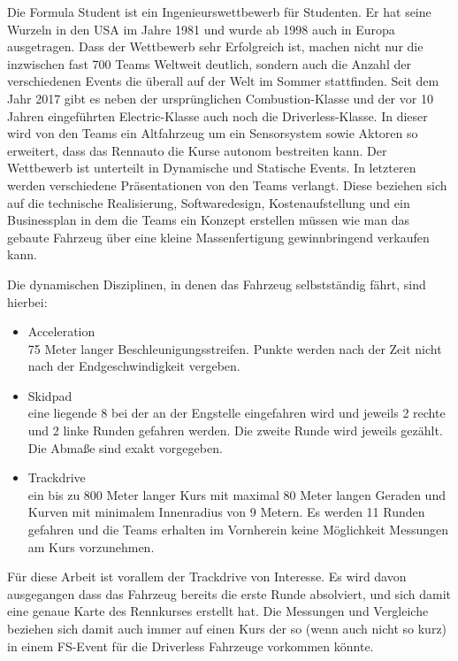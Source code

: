 \documentclass{like}
\begin{document}
Die Formula Student ist ein Ingenieurswettbewerb für Studenten. Er hat seine Wurzeln in den USA im Jahre 1981 und wurde ab 1998 auch in Europa ausgetragen.
Dass der Wettbewerb sehr Erfolgreich ist, machen nicht nur die inzwischen fast 700 Teams Weltweit \cite{FsWorldRank:1} deutlich, sondern auch die Anzahl der verschiedenen Events die überall auf der Welt im Sommer stattfinden. Seit dem Jahr 2017 gibt es neben der ursprünglichen Combustion-Klasse und der vor 10 Jahren eingeführten Electric-Klasse auch noch die Driverless-Klasse.
In dieser wird von den Teams ein Altfahrzeug um ein Sensorsystem sowie Aktoren so erweitert, dass das Rennauto die Kurse autonom bestreiten kann.
Der Wettbewerb ist unterteilt in Dynamische und Statische Events. In letzteren werden verschiedene Präsentationen von den Teams verlangt. Diese beziehen sich auf die technische Realisierung, Softwaredesign, Kostenaufstellung und ein Businessplan in dem die Teams ein Konzept erstellen müssen wie man das gebaute Fahrzeug über eine kleine Massenfertigung gewinnbringend verkaufen kann.

Die dynamischen Disziplinen, in denen das Fahrzeug selbstständig fährt, sind hierbei:
\begin{itemize}
	\item Acceleration \\ 75 Meter langer Beschleunigungsstreifen. Punkte werden nach der Zeit nicht nach der Endgeschwindigkeit vergeben.
	\item Skidpad \\ eine liegende 8 bei der an der Engstelle eingefahren wird und jeweils 2 rechte und 2 linke Runden gefahren werden. Die zweite Runde wird jeweils gezählt. Die Abmaße sind exakt vorgegeben.
	\item Trackdrive \\ ein bis zu 800 Meter langer Kurs mit maximal 80 Meter langen Geraden und Kurven mit minimalem Innenradius von 9 Metern. Es werden 11 Runden gefahren und die Teams erhalten im Vornherein keine Möglichkeit Messungen am Kurs vorzunehmen.
\end{itemize}

Für diese Arbeit ist vorallem der Trackdrive von Interesse. Es wird davon ausgegangen dass das Fahrzeug bereits die erste Runde absolviert, und sich damit eine genaue Karte des Rennkurses erstellt hat. Die Messungen und Vergleiche beziehen sich damit auch immer auf einen Kurs der so (wenn auch nicht so kurz) in einem FS-Event für die Driverless Fahrzeuge vorkommen könnte.
 
\end{document}
